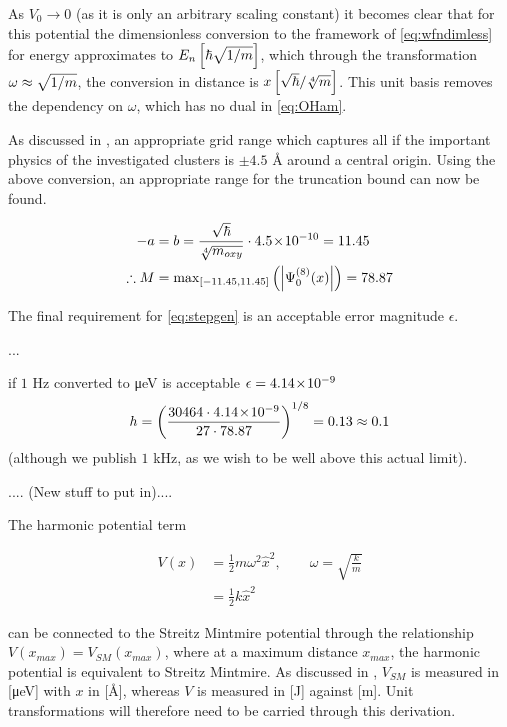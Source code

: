As $V_0 \rightarrow 0$ (as it is only an arbitrary scaling constant) it becomes clear that for this potential the dimensionless conversion to the framework of \cref{eq:wfndimless} for energy approximates to $\cramped{E_n \left[\hbar\sqrt{1/m}\right]}$, which through the transformation $\cramped{\omega \approx \sqrt{1/m}}$, the conversion in distance is $\cramped{x \left[\sqrt{\hbar}/\sqrt[4]{m}\right]}$.
This unit basis removes the dependency on $\omega$, which has no dual in \cref{eq:OHam}.

As discussed in , an appropriate grid range which captures all if the important physics of the investigated clusters is $\pm 4.5$ Å around a central origin.
Using the above conversion, an appropriate range for the truncation bound can now be found.

\begin{align}
-a &= b = \frac{\sqrt{\hbar}}{\sqrt[4]{m_{oxy}}}\cdot 4.5\!\times\!10^{-10} = 11.45\\
\therefore M &= \mathrm{max}_{[-11.45,11.45]}\left(\left\lvert \Psi_0^{(8)}(x)\right\rvert\right) = 78.87
\end{align}

The final requirement for \cref{eq:stepgen} is an acceptable error magnitude $\epsilon$.

...

if $1$ Hz converted to μeV is acceptable  $\epsilon = 4.14\!\times\!10^{-9}$
\begin{equation}
h = \left(\frac{30464\cdot4.14\!\times\!10^{-9}}{27\cdot78.87}\right)^{1/8}=0.13 \approx 0.1\label{eq:stepopti}
\end{equation}
(although we publish $1$ kHz, as we wish to be well above this actual limit).




.... (New stuff to put in)....

The harmonic potential term

\begin{align}
V(x) &= \frac{1}{2}m\omega^2\hat{x}^2, \qquad \omega=\sqrt{\frac{k}{m}}\\
     &= \frac{1}{2}k\hat{x}^2
\end{align}

can be connected to the Streitz Mintmire potential through the relationship $V(x_{max})=V_{SM}(x_{max})$, where at a maximum distance $x_{max}$, the harmonic potential is equivalent to Streitz Mintmire. As discussed in , $V_{SM}$ is measured in [μeV] with $x$ in [Å], whereas $V$ is measured in [J] against [m]. Unit transformations will therefore need to be carried through this derivation.

